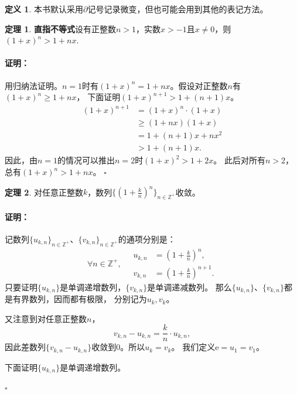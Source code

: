 \documentclass[12pt,UTF8]{ctexbook}
\theoremstyle{definition}
\newtheorem{df}{定义}[section]
\newtheorem{tm}{定理}[section]
\theoremstyle{plain}
\renewenvironment{proof}{\paragraph{\textbf{证明：}}}{\hfill$\square$}
\begin{document}
\begin{appendix}
\begin{df}
本书默认采用$\partial$记号记录微变，但也可能会用到其他的表记方法。
\end{df}

\begin{tm}{\textbf{直指不等式}}\label{tm:b-1-20}
    设有正整数$n > 1$，实数$x > -1$且$x \neq 0$，则$(1 + x)^n > 1 + nx.$
\end{tm}

\begin{proof}
    用归纳法证明。$n = 1$时有$(1 + x)^n = 1 + nx$。假设对正整数$n$有$(1 + x)^n \geqslant 1 + nx$，
    下面证明$(1 + x)^{n+1} > 1 + (n+1)x$。
    \begin{align*}
        (1 + x)^{n+1} &= (1 + x)^{n} \cdot (1 + x)  \\
        &\geqslant (1 + nx)(1 + x)  \\
        &= 1 + (n + 1)x + nx^2  \\
        &> 1 + (n + 1)x.
   \end{align*}
   因此，由$n=1$的情况可以推出$n=2$时$(1 + x)^{2} > 1 + 2x$。
   此后对所有$n>2$，总有$(1 + x)^{n} > 1 + nx$。
\end{proof}

\begin{tm}\label{tm:b-1-30}
    对任意正整数$k$，数列$\{\left(1 + \frac{k}{n}\right)^n\}_{n\in\mathbb{Z}^+}$收敛。
\end{tm}

\begin{proof}
    记数列$\{u_{k,n}\}_{n\in\mathbb{Z}^+}$、$\{v_{k,n}\}_{n\in\mathbb{Z}^+}$的通项分别是：
    $$
    \forall n \in\mathbb{Z}^+, \quad
    \begin{array}{cl}
        u_{k,n} &=  \left(1 + \frac{k}{n}\right)^n, \\
        v_{k,n} &= \left(1 + \frac{k}{n}\right)^{n+1}.
    \end{array}
    $$
    只要证明$\{u_{k,n}\}$是单调递增数列，$\{v_{k,n}\}$是单调递减数列。
    那么$\{u_{k,n}\}$、$\{v_{k,n}\}$都是有界数列，因而都有极限，
    分别记为$u_{k}, v_k$。

    又注意到对任意正整数$n$，
    $$v_{k,n} - u_{k,n} = \frac{k}{n} \cdot u_{k,n}, $$
    因此差数列$\{v_{k,n} - u_{k,n}\}$收敛到$0$。所以$u_k = v_k$。
    我们定义$\mathrm{e} = u_1 = v_1$。

    下面证明$\{u_{k,n}\}$是单调递增数列。


\end{proof}
\end{appendix}
\end{document}
